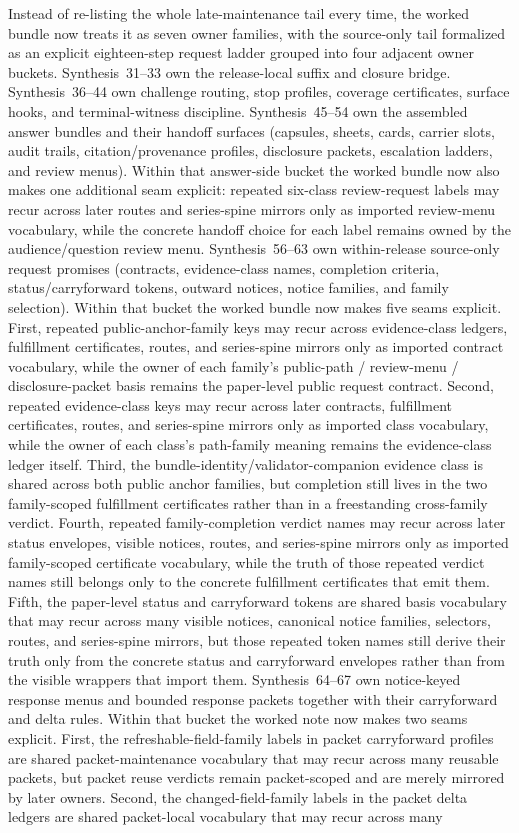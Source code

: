 \documentclass[11pt]{article}
\begin{document}
Instead of re-listing the whole late-maintenance tail every time, the worked bundle now treats it as seven owner families, with the source-only tail formalized as an explicit eighteen-step request ladder grouped into four adjacent owner buckets. Synthesis~31--33 own the release-local suffix and closure bridge. Synthesis~36--44 own challenge routing, stop profiles, coverage certificates, surface hooks, and terminal-witness discipline. Synthesis~45--54 own the assembled answer bundles and their handoff surfaces (capsules, sheets, cards, carrier slots, audit trails, citation/provenance profiles, disclosure packets, escalation ladders, and review menus). Within that answer-side bucket the worked bundle now also makes one additional seam explicit: repeated six-class review-request labels may recur across later routes and series-spine mirrors only as imported review-menu vocabulary, while the concrete handoff choice for each label remains owned by the audience/question review menu. Synthesis~56--63 own within-release source-only request promises (contracts, evidence-class names, completion criteria, status/carryforward tokens, outward notices, notice families, and family selection). Within that bucket the worked bundle now makes five seams explicit. First, repeated public-anchor-family keys may recur across evidence-class ledgers, fulfillment certificates, routes, and series-spine mirrors only as imported contract vocabulary, while the owner of each family's public-path / review-menu / disclosure-packet basis remains the paper-level public request contract. Second, repeated evidence-class keys may recur across later contracts, fulfillment certificates, routes, and series-spine mirrors only as imported class vocabulary, while the owner of each class's path-family meaning remains the evidence-class ledger itself. Third, the bundle-identity/validator-companion evidence class is shared across both public anchor families, but completion still lives in the two family-scoped fulfillment certificates rather than in a freestanding cross-family verdict. Fourth, repeated family-completion verdict names may recur across later status envelopes, visible notices, routes, and series-spine mirrors only as imported family-scoped certificate vocabulary, while the truth of those repeated verdict names still belongs only to the concrete fulfillment certificates that emit them. Fifth, the paper-level status and carryforward tokens are shared basis vocabulary that may recur across many visible notices, canonical notice families, selectors, routes, and series-spine mirrors, but those repeated token names still derive their truth only from the concrete status and carryforward envelopes rather than from the visible wrappers that import them. Synthesis~64--67 own notice-keyed response menus and bounded response packets together with their carryforward and delta rules. Within that bucket the worked note now makes two seams explicit. First, the refreshable-field-family labels in packet carryforward profiles are shared packet-maintenance vocabulary that may recur across many reusable packets, but packet reuse verdicts remain packet-scoped and are merely mirrored by later owners. Second, the changed-field-family labels in the packet delta ledgers are shared packet-local vocabulary that may recur across many 
\end{document}
